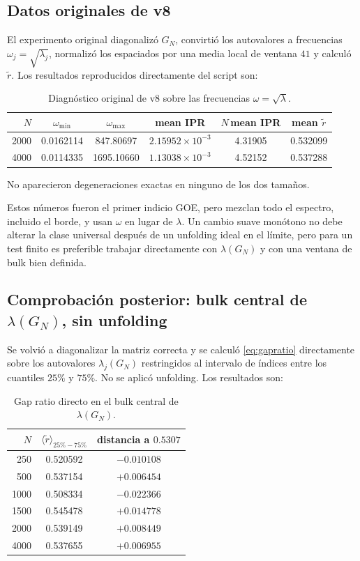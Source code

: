 \documentclass[11pt,a4paper]{article}
\begin{document}
\subsection{Datos originales de v8}

El experimento original diagonalizó $G_N$, convirtió los autovalores a frecuencias $\omega_j=\sqrt{\lambda_j}$, normalizó los espaciados por una media local de ventana $41$ y calculó $\widetilde r$. Los resultados reproducidos directamente del script son:

\begin{table}[htbp]
\centering
\caption{Diagnóstico original de v8 sobre las frecuencias $\omega=\sqrt\lambda$.}
\label{tab:v8-original}
\begin{tabular}{rccccc}
\toprule
$N$ & $\omega_{\min}$ & $\omega_{\max}$ & mean IPR & $N\,$mean IPR & mean $\widetilde r$\\
\midrule
2000 & 0.0162114 & 847.80697  & $2.15952\times10^{-3}$ & 4.31905 & 0.532099\\
4000 & 0.0114335 & 1695.10660 & $1.13038\times10^{-3}$ & 4.52152 & 0.537288\\
\bottomrule
\end{tabular}
\end{table}

No aparecieron degeneraciones exactas en ninguno de los dos tamaños.

Estos números fueron el primer indicio GOE, pero mezclan todo el espectro, incluido el borde, y usan $\omega$ en lugar de $\lambda$. Un cambio suave monótono no debe alterar la clase universal después de un unfolding ideal en el límite, pero para un test finito es preferible trabajar directamente con $\lambda(G_N)$ y con una ventana de bulk bien definida.

\subsection{Comprobación posterior: bulk central de $\lambda(G_N)$, sin unfolding}

Se volvió a diagonalizar la matriz correcta y se calculó \eqref{eq:gapratio} directamente sobre los autovalores $\lambda_j(G_N)$ restringidos al intervalo de índices entre los cuantiles $25\%$ y $75\%$. No se aplicó unfolding. Los resultados son:

\begin{table}[htbp]
\centering
\caption{Gap ratio directo en el bulk central de $\lambda(G_N)$.}
\label{tab:r-central}
\begin{tabular}{rcc}
\toprule
$N$ & $\langle\widetilde r\rangle_{25\%-75\%}$ & distancia a $0.5307$\\
\midrule
250  & 0.520592 & $-0.010108$\\
500  & 0.537154 & $+0.006454$\\
1000 & 0.508334 & $-0.022366$\\
1500 & 0.545478 & $+0.014778$\\
2000 & 0.539149 & $+0.008449$\\
4000 & 0.537655 & $+0.006955$\\
\bottomrule
\end{tabular}
\end{table}
\end{document}
